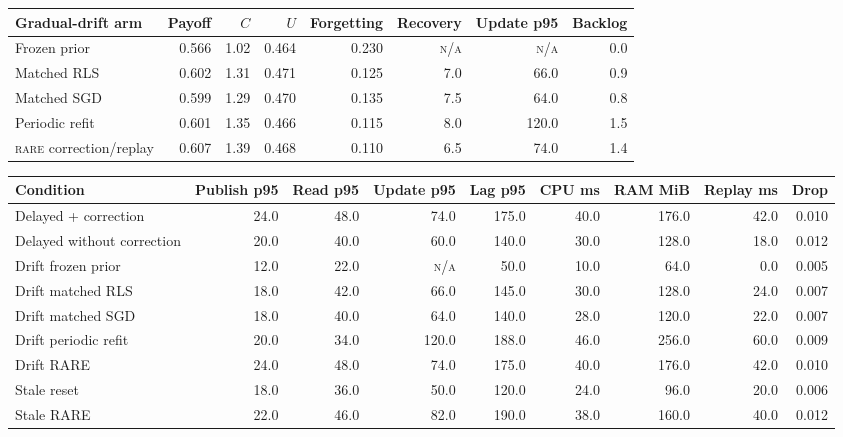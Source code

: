 \documentclass[10pt,a4paper,landscape]{article}
\newcommand{\rare}{\textsc{rare}}\newcommand{\na}{\textsc{n/a}}\newcommand{\nog}{\textsc{no-go}}\newcommand{\ok}{\textsc{pass}}
\begin{document}
\begin{center}\scriptsize\begin{tabular}{lrrrrrrr}\toprule Gradual-drift arm & Payoff & $C$ & $U$ & Forgetting & Recovery & Update p95 & Backlog \\\midrule
Frozen prior & 0.566 & 1.02 & 0.464 & 0.230 & \na & \na & 0.0 \\

Matched RLS & 0.602 & 1.31 & 0.471 & 0.125 & 7.0 & 66.0 & 0.9 \\

Matched SGD & 0.599 & 1.29 & 0.470 & 0.135 & 7.5 & 64.0 & 0.8 \\

Periodic refit & 0.601 & 1.35 & 0.466 & 0.115 & 8.0 & 120.0 & 1.5 \\

\rare{} correction/replay & 0.607 & 1.39 & 0.468 & 0.110 & 6.5 & 74.0 & 1.4 \\

\bottomrule\end{tabular}\end{center}
\begin{center}\scriptsize\begin{tabular}{lrrrrrrrr}\toprule Condition & Publish p95 & Read p95 & Update p95 & Lag p95 & CPU ms & RAM MiB & Replay ms & Drop \\\midrule
Delayed + correction & 24.0 & 48.0 & 74.0 & 175.0 & 40.0 & 176.0 & 42.0 & 0.010 \\

Delayed without correction & 20.0 & 40.0 & 60.0 & 140.0 & 30.0 & 128.0 & 18.0 & 0.012 \\

Drift frozen prior & 12.0 & 22.0 & \na & 50.0 & 10.0 & 64.0 & 0.0 & 0.005 \\

Drift matched RLS & 18.0 & 42.0 & 66.0 & 145.0 & 30.0 & 128.0 & 24.0 & 0.007 \\

Drift matched SGD & 18.0 & 40.0 & 64.0 & 140.0 & 28.0 & 120.0 & 22.0 & 0.007 \\

Drift periodic refit & 20.0 & 34.0 & 120.0 & 188.0 & 46.0 & 256.0 & 60.0 & 0.009 \\

Drift RARE & 24.0 & 48.0 & 74.0 & 175.0 & 40.0 & 176.0 & 42.0 & 0.010 \\

Stale reset & 18.0 & 36.0 & 50.0 & 120.0 & 24.0 & 96.0 & 20.0 & 0.006 \\

Stale RARE & 22.0 & 46.0 & 82.0 & 190.0 & 38.0 & 160.0 & 40.0 & 0.012 \\

\bottomrule\end{tabular}\end{center}
\end{document}
